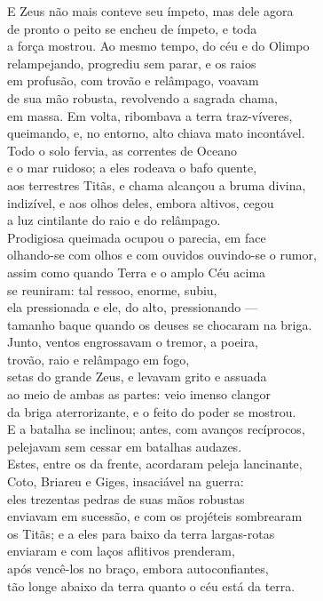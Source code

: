 \begin{pages}
\begin{Rightside}
\quad{}E Zeus não mais conteve seu ímpeto, mas dele agora\\
de pronto o peito se encheu de ímpeto, e toda\\
a força mostrou. Ao mesmo tempo, do céu e do Olimpo\\
relampejando, progrediu sem parar, e os raios \\
em profusão, com trovão e relâmpago, voavam\\
de sua mão robusta, revolvendo a sagrada chama,\\
em massa. Em volta, ribombava a terra traz-víveres,\\
queimando, e, no entorno, alto chiava mato incontável.\\
Todo o solo fervia, as correntes de Oceano \\
e o mar ruidoso; a eles rodeava o bafo quente,\\
aos terrestres Titãs, e chama alcançou a bruma divina,\\
indizível, e aos olhos deles, embora altivos, cegou\\
a luz cintilante do raio e do relâmpago.\\
Prodigiosa queimada ocupou o  parecia, em face\\
olhando-se com olhos e com ouvidos ouvindo-se o rumor,\\
assim como quando Terra e o amplo Céu acima\\
se reuniram: tal ressoo, enorme, subiu,\\
ela pressionada e ele, do alto, pressionando ---\\
tamanho baque quando os deuses se chocaram na briga. \\
Junto, ventos engrossavam o tremor, a poeira,\\
trovão, raio e relâmpago em fogo,\\
setas do grande Zeus, e levavam grito e assuada\\
ao meio de ambas as partes: veio imenso clangor\\
da briga aterrorizante, e o feito do poder se mostrou. \\

\quad{}E a batalha se inclinou; antes, com avanços recíprocos,\\
pelejavam sem cessar em batalhas audazes.\\
Estes, entre os da frente, acordaram peleja lancinante,\\
Coto, Briareu e Giges, insaciável na guerra:\\
eles trezentas pedras de suas mãos robustas \\
enviavam em sucessão, e com os projéteis sombrearam\\
os Titãs; e a eles para baixo da terra largas-rotas\\
enviaram e com laços aflitivos prenderam,\\
após vencê-los no braço, embora autoconfiantes,\\
tão longe abaixo da terra quanto o céu está da terra. \\[5pt]


\end{Rightside}
\end{pages}
